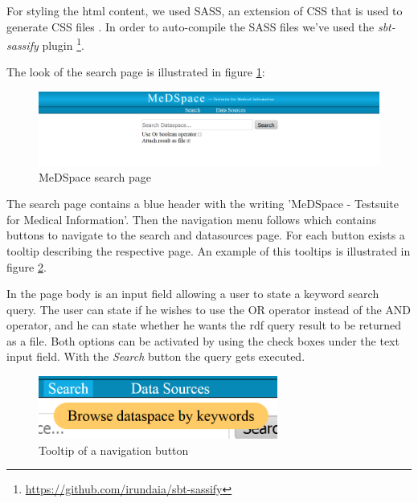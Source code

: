 For styling the html content, we used SASS, an extension of CSS that is used to generate CSS files \cite{SASS}. In order to auto-compile the SASS files we've used the \emph{sbt-sassify} plugin \footnote{\url{https://github.com/irundaia/sbt-sassify}}. 

The look of the search page is illustrated in figure \ref{MeDSpaceSearchPage}:

\begin{figure}[H]
	\begin{center}
		\includegraphics[width=1\textwidth]{figures/MeDSpace-GUI-Search-Main.png}
	\end{center}
	\caption{MeDSpace search page}
	\label{MeDSpaceSearchPage}
\end{figure}

The search page contains a blue header with the writing 'MeDSpace - Testsuite for Medical Information'. Then the navigation menu follows which contains buttons to navigate to the search and datasources page. For each button exists a tooltip describing the respective page. An example of this tooltips is illustrated in figure \ref{MeDSpaceDataTooltip}. 

In the page body is an input field allowing a user to state a keyword search query. The user can state if he wishes to use the OR operator instead of the AND operator, and he can state whether he wants the rdf query result to be returned as a file. Both options can be activated by using the check boxes under the text input field. With the \emph{Search} button the query gets executed.

\begin{figure}[H]
	\begin{center}
		\includegraphics[width=0.7\textwidth]{figures/MeDSpace-GUI-Tooltip.png}
	\end{center}
	\caption{Tooltip of a navigation button}
	\label{MeDSpaceDataTooltip}
\end{figure}



